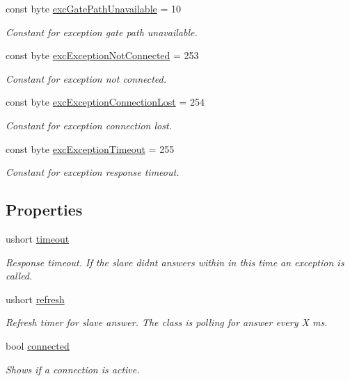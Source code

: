 \begin{DoxyCompactItemize}
const byte \hyperlink{class_robo_library_1_1_mod_bus_a94b3937e354438a1e9adc5016c203cfe}{exc\+Gate\+Path\+Unavailable} = 10
\begin{DoxyCompactList}\small\item\em Constant for exception gate path unavailable.\end{DoxyCompactList}\item 
const byte \hyperlink{class_robo_library_1_1_mod_bus_a0c10f797e2ff5ffacb8c8795dd2590bb}{exc\+Exception\+Not\+Connected} = 253
\begin{DoxyCompactList}\small\item\em Constant for exception not connected.\end{DoxyCompactList}\item 
const byte \hyperlink{class_robo_library_1_1_mod_bus_afb92b4598e76f2183460d34fa1c98b2f}{exc\+Exception\+Connection\+Lost} = 254
\begin{DoxyCompactList}\small\item\em Constant for exception connection lost.\end{DoxyCompactList}\item 
const byte \hyperlink{class_robo_library_1_1_mod_bus_a0d3833f9b9c658a3298105f096ee2f28}{exc\+Exception\+Timeout} = 255
\begin{DoxyCompactList}\small\item\em Constant for exception response timeout.\end{DoxyCompactList}\end{DoxyCompactItemize}
\subsection*{Properties}
\begin{DoxyCompactItemize}
\item 
ushort \hyperlink{class_robo_library_1_1_mod_bus_a00b9ec8fc1d37c089ff1e2bee2f7a61a}{timeout}
\begin{DoxyCompactList}\small\item\em Response timeout. If the slave didn\textquotesingle{}t answers within in this time an exception is called.\end{DoxyCompactList}\item 
ushort \hyperlink{class_robo_library_1_1_mod_bus_a4043bd356bda6e89fd95247956b0708c}{refresh}
\begin{DoxyCompactList}\small\item\em Refresh timer for slave answer. The class is polling for answer every X ms.\end{DoxyCompactList}\item 
bool \hyperlink{class_robo_library_1_1_mod_bus_ab5a2fb9411e2257f48dd80672326fac1}{connected}
\begin{DoxyCompactList}\small\item\em Shows if a connection is active.\end{DoxyCompactList}\end{DoxyCompactItemize}

